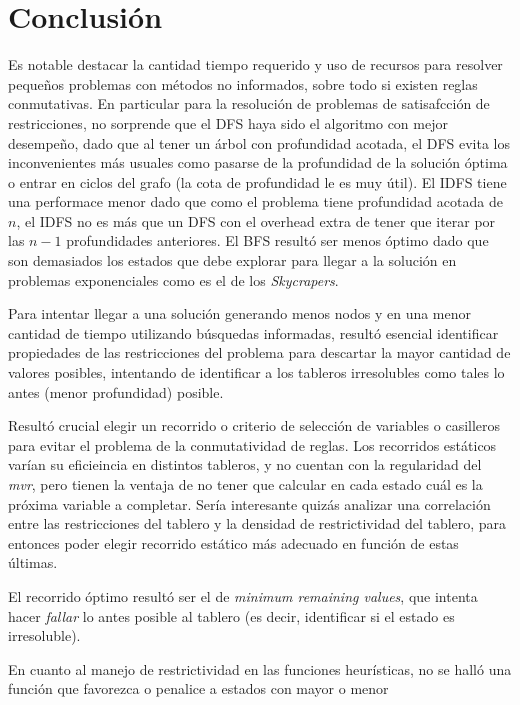 \documentclass[%
    final,
    reprint,
    notitlepage,
    narroweqnarray,
    inline,
    twoside,
    invited
    ]{ieee}
\begin{document}
\section{Conclusión}

\PARstart Es notable destacar la cantidad tiempo requerido y uso de recursos para resolver pequeños problemas con métodos no informados, sobre todo si existen reglas conmutativas. 
 En particular para la resolución de problemas de satisafcción de restricciones, no sorprende que el DFS haya sido el algoritmo con mejor desempeño, dado que al tener un árbol con profundidad acotada, el DFS evita los inconvenientes más usuales como pasarse de la profundidad de la solución óptima o entrar en ciclos del grafo (la cota de profundidad le es muy útil). El IDFS tiene una performace menor dado que como el problema tiene profundidad acotada de $n$, el IDFS no es más que un DFS con el overhead extra de tener que iterar por las $n-1$ profundidades anteriores. El BFS resultó ser menos óptimo dado que son demasiados los estados que debe explorar para llegar a la solución en problemas exponenciales como es el de los \textit{Skycrapers}. 
\par Para intentar llegar a una solución generando menos nodos y en una menor cantidad de tiempo utilizando búsquedas informadas, resultó esencial identificar 
propiedades de las restricciones del problema para descartar la mayor cantidad de valores posibles, intentando de identificar a los tableros irresolubles como tales 
lo antes (menor profundidad) posible.
\par Resultó crucial elegir un recorrido o criterio de selección de variables o casilleros para evitar el problema de la conmutatividad de reglas. Los 
recorridos estáticos varían su eficieincia en distintos tableros, y no cuentan con la regularidad del \textit{mvr}, pero tienen la ventaja de no 
tener que calcular en cada estado cuál es la próxima variable a completar. Sería interesante quizás analizar una correlación entre las restricciones 
del tablero y la densidad de restrictividad del tablero, para entonces poder elegir recorrido estático más adecuado en función de estas últimas.
\par El recorrido óptimo resultó ser el de \textit{minimum remaining values}, que intenta hacer \textit{fallar} lo antes posible al tablero (es decir, 
identificar si el estado es irresoluble).
\par En cuanto al manejo de restrictividad en las funciones heurísticas, no se halló una función que favorezca o penalice a estados con mayor o menor 
\end{document}
